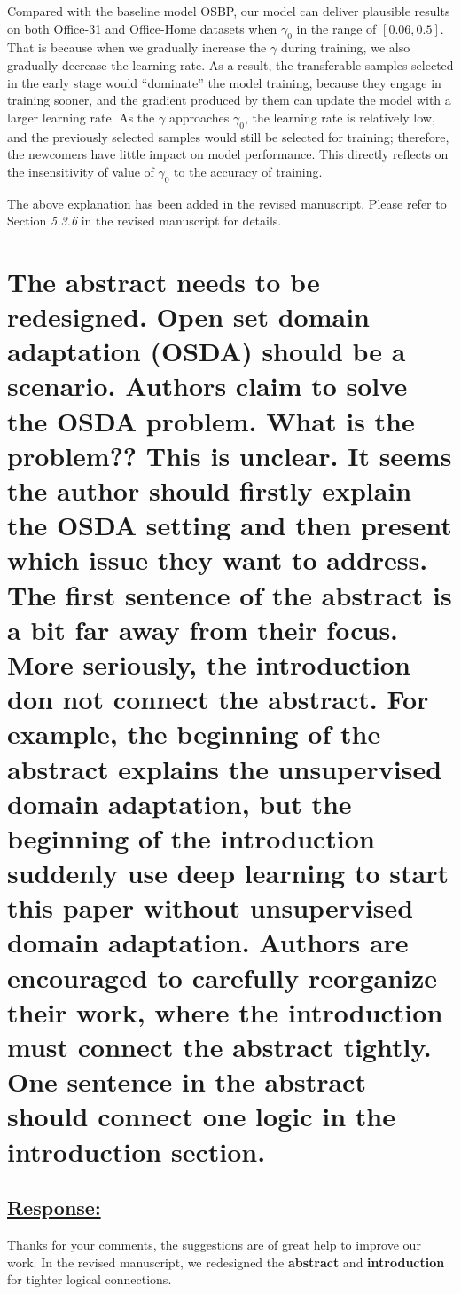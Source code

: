 Compared with the baseline model OSBP, our model can deliver plausible results on both Office-31 and Office-Home datasets when $\gamma_0$ in the range of $[0.06, 0.5]$.
That is because when we gradually increase the $\gamma$ during training, we also gradually decrease the learning rate.
As a result, the transferable samples selected in the early stage would ``dominate'' the model training, because they engage in training sooner, and the gradient produced by them can update the model with a larger learning rate.
As the $\gamma$ approaches $\gamma_0$, the learning rate is relatively low, and the previously selected samples would still be selected for training; therefore, the newcomers have little impact on model performance.
This directly reflects on the insensitivity of value of $\gamma_0$ to the accuracy of training.

The above explanation has been added in the revised manuscript.
Please refer to Section \textit{5.3.6} in the revised manuscript for details.

\renewcommand\thesection{\arabic{section}}
\setcounter{section}{0}

\section{The abstract needs to be redesigned.
    Open set domain adaptation (OSDA) should be a scenario.
    Authors claim to solve the OSDA problem. What is the problem?? This is unclear.
    It seems the author should firstly explain the OSDA setting and then present which issue they want to address. The first sentence of the abstract is a bit far away from their focus.
    More seriously, the introduction don not connect the abstract.
    For example, the beginning of the abstract explains the unsupervised domain adaptation, but the beginning of the introduction suddenly use deep learning to start this paper without unsupervised domain adaptation.
    Authors are encouraged to carefully reorganize their work, where the introduction must connect the abstract tightly.
    One sentence in the abstract should connect one logic in the introduction section.}
\subsection*{\underline{\textbf{Response:}}}


Thanks for your comments, the suggestions are of great help to improve our work.
In the revised manuscript, we redesigned the \textbf{abstract} and \textbf{introduction} for tighter logical connections.

